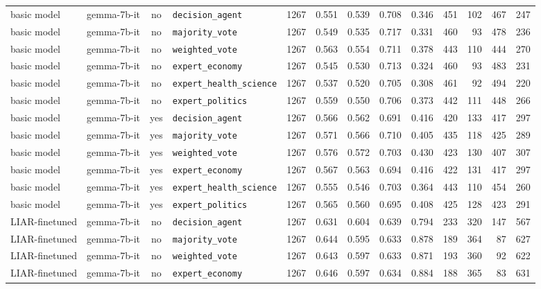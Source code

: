 \begin{landscape}
\begin{longtable}{@{}l p{3.2cm} c l r r r r r r r r r@{}}
basic model & gemma-7b-it & no & \texttt{decision\_agent} & 1267 & 0.551 & 0.539 & 0.708 & 0.346 & 451 & 102 & 467 & 247\\
basic model & gemma-7b-it & no & \texttt{majority\_vote} & 1267 & 0.549 & 0.535 & 0.717 & 0.331 & 460 & 93 & 478 & 236\\
basic model & gemma-7b-it & no & \texttt{weighted\_vote} & 1267 & 0.563 & 0.554 & 0.711 & 0.378 & 443 & 110 & 444 & 270\\
basic model & gemma-7b-it & no & \texttt{expert\_economy} & 1267 & 0.545 & 0.530 & 0.713 & 0.324 & 460 & 93 & 483 & 231\\
basic model & gemma-7b-it & no & \texttt{expert\_health\_science} & 1267 & 0.537 & 0.520 & 0.705 & 0.308 & 461 & 92 & 494 & 220\\
basic model & gemma-7b-it & no & \texttt{expert\_politics} & 1267 & 0.559 & 0.550 & 0.706 & 0.373 & 442 & 111 & 448 & 266\\
basic model & gemma-7b-it & yes & \texttt{decision\_agent} & 1267 & 0.566 & 0.562 & 0.691 & 0.416 & 420 & 133 & 417 & 297\\
basic model & gemma-7b-it & yes & \texttt{majority\_vote} & 1267 & 0.571 & 0.566 & 0.710 & 0.405 & 435 & 118 & 425 & 289\\
basic model & gemma-7b-it & yes & \texttt{weighted\_vote} & 1267 & 0.576 & 0.572 & 0.703 & 0.430 & 423 & 130 & 407 & 307\\
basic model & gemma-7b-it & yes & \texttt{expert\_economy} & 1267 & 0.567 & 0.563 & 0.694 & 0.416 & 422 & 131 & 417 & 297\\
basic model & gemma-7b-it & yes & \texttt{expert\_health\_science} & 1267 & 0.555 & 0.546 & 0.703 & 0.364 & 443 & 110 & 454 & 260\\
basic model & gemma-7b-it & yes & \texttt{expert\_politics} & 1267 & 0.565 & 0.560 & 0.695 & 0.408 & 425 & 128 & 423 & 291\\
\midrule
LIAR-finetuned & gemma-7b-it & no & \texttt{decision\_agent} & 1267 & 0.631 & 0.604 & 0.639 & 0.794 & 233 & 320 & 147 & 567\\
LIAR-finetuned & gemma-7b-it & no & \texttt{majority\_vote} & 1267 & 0.644 & 0.595 & 0.633 & 0.878 & 189 & 364 & 87 & 627\\
LIAR-finetuned & gemma-7b-it & no & \texttt{weighted\_vote} & 1267 & 0.643 & 0.597 & 0.633 & 0.871 & 193 & 360 & 92 & 622\\
LIAR-finetuned & gemma-7b-it & no & \texttt{expert\_economy} & 1267 & 0.646 & 0.597 & 0.634 & 0.884 & 188 & 365 & 83 & 631\\

\end{longtable}
\end{landscape}
